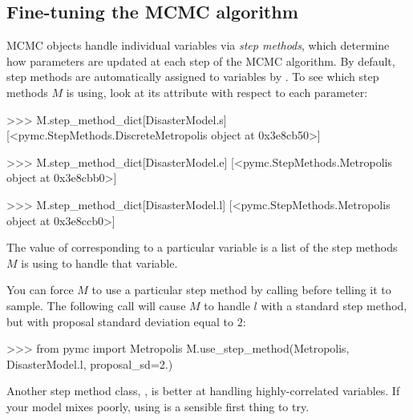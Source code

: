 \documentclass[]{jss}
\begin{document}
\subsection{Fine-tuning the MCMC algorithm}

MCMC objects handle individual variables via \emph{step methods}, which determine how parameters are updated at each step of the MCMC algorithm. By default, step methods are automatically assigned to variables by . To see which step methods $M$ is using, look at its  attribute with respect to each parameter:
\begin{CodeInput}
>>> M.step_method_dict[DisasterModel.s]
[<pymc.StepMethods.DiscreteMetropolis object at 0x3e8cb50>]

>>> M.step_method_dict[DisasterModel.e]
[<pymc.StepMethods.Metropolis object at 0x3e8cbb0>]

>>> M.step_method_dict[DisasterModel.l]
[<pymc.StepMethods.Metropolis object at 0x3e8ccb0>]
\end{CodeInput}
The value of  corresponding to a particular variable is a list of the step methods $M$ is using to handle that variable.

You can force $M$ to use a particular step method by calling  before telling it to sample. The following call will cause $M$ to handle $l$ with a standard  step method, but with proposal standard deviation equal to $2$:
\begin{CodeInput}
>>> from pymc import Metropolis
M.use_step_method(Metropolis, DisasterModel.l, proposal_sd=2.)
\end{CodeInput}

Another step method class, , is better at handling highly-correlated variables. If your model mixes poorly, using  is a sensible first thing to try.
\end{document}
